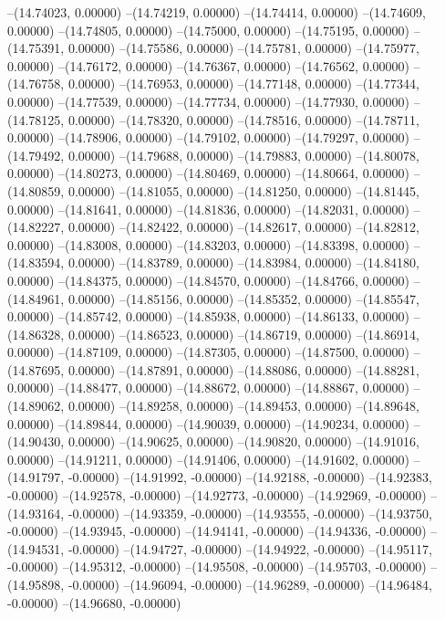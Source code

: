 --(14.74023, 0.00000)
--(14.74219, 0.00000)
--(14.74414, 0.00000)
--(14.74609, 0.00000)
--(14.74805, 0.00000)
--(14.75000, 0.00000)
--(14.75195, 0.00000)
--(14.75391, 0.00000)
--(14.75586, 0.00000)
--(14.75781, 0.00000)
--(14.75977, 0.00000)
--(14.76172, 0.00000)
--(14.76367, 0.00000)
--(14.76562, 0.00000)
--(14.76758, 0.00000)
--(14.76953, 0.00000)
--(14.77148, 0.00000)
--(14.77344, 0.00000)
--(14.77539, 0.00000)
--(14.77734, 0.00000)
--(14.77930, 0.00000)
--(14.78125, 0.00000)
--(14.78320, 0.00000)
--(14.78516, 0.00000)
--(14.78711, 0.00000)
--(14.78906, 0.00000)
--(14.79102, 0.00000)
--(14.79297, 0.00000)
--(14.79492, 0.00000)
--(14.79688, 0.00000)
--(14.79883, 0.00000)
--(14.80078, 0.00000)
--(14.80273, 0.00000)
--(14.80469, 0.00000)
--(14.80664, 0.00000)
--(14.80859, 0.00000)
--(14.81055, 0.00000)
--(14.81250, 0.00000)
--(14.81445, 0.00000)
--(14.81641, 0.00000)
--(14.81836, 0.00000)
--(14.82031, 0.00000)
--(14.82227, 0.00000)
--(14.82422, 0.00000)
--(14.82617, 0.00000)
--(14.82812, 0.00000)
--(14.83008, 0.00000)
--(14.83203, 0.00000)
--(14.83398, 0.00000)
--(14.83594, 0.00000)
--(14.83789, 0.00000)
--(14.83984, 0.00000)
--(14.84180, 0.00000)
--(14.84375, 0.00000)
--(14.84570, 0.00000)
--(14.84766, 0.00000)
--(14.84961, 0.00000)
--(14.85156, 0.00000)
--(14.85352, 0.00000)
--(14.85547, 0.00000)
--(14.85742, 0.00000)
--(14.85938, 0.00000)
--(14.86133, 0.00000)
--(14.86328, 0.00000)
--(14.86523, 0.00000)
--(14.86719, 0.00000)
--(14.86914, 0.00000)
--(14.87109, 0.00000)
--(14.87305, 0.00000)
--(14.87500, 0.00000)
--(14.87695, 0.00000)
--(14.87891, 0.00000)
--(14.88086, 0.00000)
--(14.88281, 0.00000)
--(14.88477, 0.00000)
--(14.88672, 0.00000)
--(14.88867, 0.00000)
--(14.89062, 0.00000)
--(14.89258, 0.00000)
--(14.89453, 0.00000)
--(14.89648, 0.00000)
--(14.89844, 0.00000)
--(14.90039, 0.00000)
--(14.90234, 0.00000)
--(14.90430, 0.00000)
--(14.90625, 0.00000)
--(14.90820, 0.00000)
--(14.91016, 0.00000)
--(14.91211, 0.00000)
--(14.91406, 0.00000)
--(14.91602, 0.00000)
--(14.91797, -0.00000)
--(14.91992, -0.00000)
--(14.92188, -0.00000)
--(14.92383, -0.00000)
--(14.92578, -0.00000)
--(14.92773, -0.00000)
--(14.92969, -0.00000)
--(14.93164, -0.00000)
--(14.93359, -0.00000)
--(14.93555, -0.00000)
--(14.93750, -0.00000)
--(14.93945, -0.00000)
--(14.94141, -0.00000)
--(14.94336, -0.00000)
--(14.94531, -0.00000)
--(14.94727, -0.00000)
--(14.94922, -0.00000)
--(14.95117, -0.00000)
--(14.95312, -0.00000)
--(14.95508, -0.00000)
--(14.95703, -0.00000)
--(14.95898, -0.00000)
--(14.96094, -0.00000)
--(14.96289, -0.00000)
--(14.96484, -0.00000)
--(14.96680, -0.00000)
